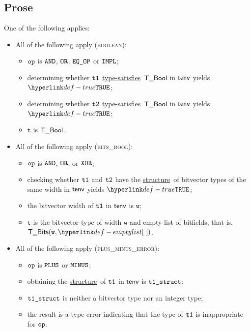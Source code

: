 \documentclass{book}
\newcommand\ProseOrTypeError[0]{\ProseTerminateAs{\TypeErrorConfig}}
\newcommand\structure[0]{\hyperlink{def-structure}{structure}}
\newcommand\typesatisfies[0]{\hyperlink{def-typesatisfies}{type-satisfies}}
\newcommand\vt[0]{\texttt{t}}
\newcommand\vw[0]{\texttt{w}}
\begin{document}
\subsection{Prose}
One of the following applies:
\begin{itemize}
  \item All of the following apply (\textsc{boolean}):
  \begin{itemize}
    \item $\texttt{op}$ is $\texttt{AND}$, $\texttt{OR}$, $\texttt{EQ\_OP}$ or $\texttt{IMPL}$;
    \item determining whether $\texttt{t1}$ \typesatisfies\ $\textsf{T\_Bool}$ in $\textsf{tenv}$ yields $\True$\ProseOrTypeError;
    \item determining whether $\texttt{t2}$ \typesatisfies\ $\textsf{T\_Bool}$ in $\textsf{tenv}$ yields $\True$\ProseOrTypeError;
    \item $\vt$ is $\textsf{T\_Bool}$.
  \end{itemize}

  \item All of the following apply (\textsc{bits\_bool}):
  \begin{itemize}
    \item $\texttt{op}$ is $\texttt{AND}$, $\texttt{OR}$, or $\texttt{XOR}$;
    \item checking whether $\texttt{t1}$ and $\texttt{t2}$ have the \structure\ of bitvector types
          of the same width in $\textsf{tenv}$ yields $\True$\ProseOrTypeError;
    \item the bitvector width of $\texttt{t1}$ in $\textsf{tenv}$ is $\vw$;
    \item $\vt$ is the bitvector type of width $\vw$ and empty list of bitfields, that is, \\ $\TBits(\vw, \emptylist)$.
  \end{itemize}

  \item All of the following apply (\textsc{plus\_minus\_error}):
  \begin{itemize}
    \item $\texttt{op}$ is $\texttt{PLUS}$ or $\texttt{MINUS}$;
    \item obtaining the \structure\ of $\texttt{t1}$ in $\textsf{tenv}$ is $\texttt{t1\_struct}$\ProseOrTypeError;
    \item $\texttt{t1\_struct}$ is neither a bitvector type nor an integer type;
    \item the result is a type error indicating that the type of $\texttt{t1}$ is inappropriate for $\texttt{op}$.
  \end{itemize}


\end{itemize}
\end{document}
